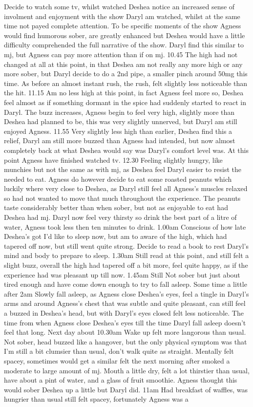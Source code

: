 \documentclass[12pt]{book}
\begin{document}
Decide to watch some tv, whilst watched Deshea notice an increased sense of involment and enjoyment with the show Daryl am watched, whilst at the same time not payed complete attention. To be specific moments of the show Agness would find humorous sober, are greatly enhanced but Deshea would have a little difficulty comprehended the full narrative of the show. Daryl find this similar to mj, but Agness can pay more attention than if on mj. 10.45 The high had not changed at all at this point, in that Deshea am not really any more high or any more sober, but Daryl decide to do a 2nd pipe, a smaller pinch around 50mg this time. As before an almost instant rush, the rush, felt slightly less noticeable than the hit. 11.15 Am no less high at this point, in fact Agness feel more so, Deshea feel almost as if something dormant in the spice had suddenly started to react in Daryl. The buzz increases, Agness begin to feel very high, slightly more than Deshea had planned to be, this was very slightly unnerved, but Daryl am still enjoyed Agness. 11.55 Very slightly less high than earlier, Deshea find this a relief, Daryl am still more buzzed than Agness had intended, but now almost completely back at what Deshea would say was Daryl's comfort level was. At this point Agness have finished watched tv. 12.30 Feeling slightly hungry, like munchies but not the same as with mj, as Deshea feel Daryl easier to resist the needed to eat. Agness do however decide to eat some roasted peanuts which luckily where very close to Deshea, as Daryl still feel all Agness's muscles relaxed so had not wanted to move that much throughout the experience. The peanuts taste considerably better than when sober, but not as enjoyable to eat had Deshea had mj. Daryl now feel very thirsty so drink the best part of a litre of water, Agness took less then ten minutes to drink. 1.00am Conscious of how late Deshea's got I'd like to sleep now, but am to aware of the high, which had tapered off now, but still went quite strong. Decide to read a book to rest Daryl's mind and body to prepare to sleep. 1.30am Still read at this point, and still felt a slight buzz, overall the high had tapered off a bit more, feel quite happy, as if the experience had was pleasant up till now. 1.45am Still Not sober but just about tired enough and have come down enough to try to fall asleep. Some time a little after 2am Slowly fall asleep, as Agness close Deshea's eyes, feel a tingle in Daryl's arms and around Agness's chest that was subtle and quite pleasant, can still feel a buzzed in Deshea's head, but with Daryl's eyes closed felt less noticeable. The time from when Agness close Deshea's eyes till the time Daryl fall asleep doesn't feel that long. Next day about 10.30am Wake up felt more langorous than usual. Not sober, head buzzed like a hangover, but the only physical symptom was that I'm still a bit clumsier than usual, don't walk quite as straight. Mentally felt spacey, sometimes would get a similar felt the next morning after smoked a moderate to large amount of mj. Mouth a little dry, felt a lot thirstier than usual, have about a pint of water, and a glass of fruit smoothie. Agness thought this would sober Deshea up a little but Daryl did. 11am Had breakfast of waffles, was hungrier than usual still felt spacey, fortunately Agness was a 
\end{document}
